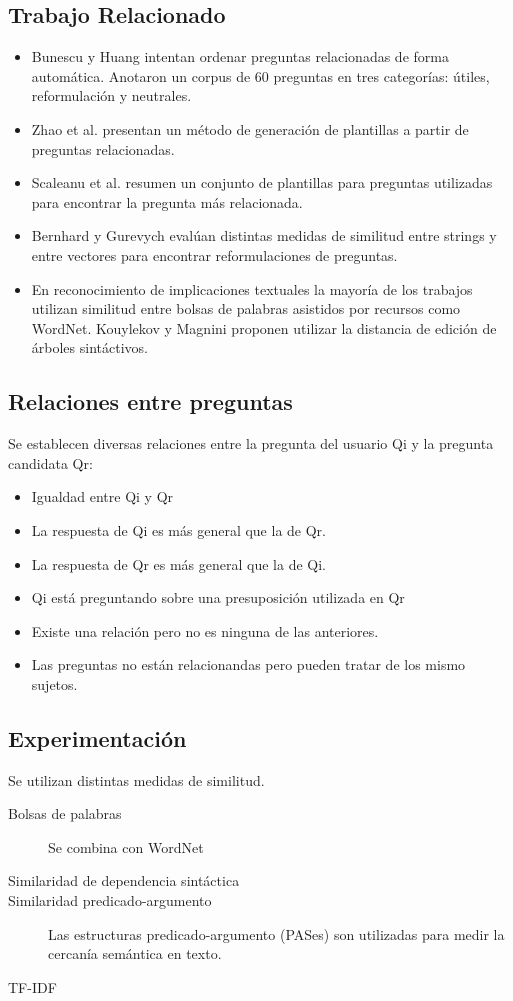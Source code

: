 \documentclass[11pt,spanish]{article}
\begin{document}
\subsection{Trabajo Relacionado}
\begin{itemize}
    \item Bunescu y Huang intentan ordenar preguntas relacionadas de forma automática. Anotaron un corpus de 60 preguntas en tres categorías: útiles, reformulación y neutrales.
    \item Zhao et al. presentan un método de generación de plantillas a partir de preguntas relacionadas.
    \item Scaleanu et al. resumen un conjunto de plantillas para preguntas utilizadas para encontrar la pregunta más relacionada.
    \item Bernhard y Gurevych evalúan distintas medidas de similitud entre strings y entre vectores para encontrar reformulaciones de preguntas.
    \item En reconocimiento de implicaciones textuales la mayoría de los trabajos utilizan similitud entre bolsas de palabras asistidos por recursos como WordNet. Kouylekov y Magnini proponen utilizar la distancia de edición de árboles sintáctivos.
\end{itemize}

\subsection{Relaciones entre preguntas}
Se establecen diversas relaciones entre la pregunta del usuario Qi y la pregunta candidata Qr:
\begin{itemize}
    \item Igualdad entre Qi y Qr
    \item La respuesta de Qi es más general que la de Qr.
    \item La respuesta de Qr es más general que la de Qi.
    \item Qi está preguntando sobre una presuposición utilizada en Qr
    \item Existe una relación pero no es ninguna de las anteriores.
    \item Las preguntas no están relacionandas pero pueden tratar de los mismo sujetos.
\end{itemize}

\subsection{Experimentación}
Se utilizan distintas medidas de similitud.
\begin{description}
    \item[Bolsas de palabras] Se combina con WordNet
    \item[Similaridad de dependencia sintáctica]
    \item[Similaridad predicado-argumento] Las estructuras predicado-argumento (PASes) son utilizadas para medir la cercanía semántica en texto.
    \item[TF-IDF]
\end{description}
\end{document}
